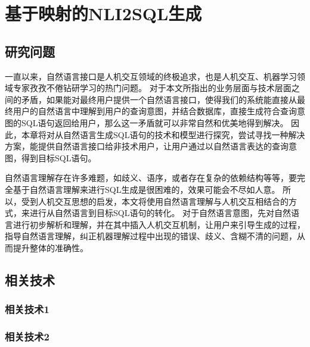 \chapter{基于映射的NLI2SQL生成}
\label{chap:interaction}
\section{研究问题}

一直以来，自然语言接口是人机交互领域的终极追求，也是人机交互、机器学习领域专家孜孜不倦钻研学习的热门问题。
对于本文所指出的业务层面与技术层面之间的矛盾，如果能对最终用户提供一个自然语言接口，使得我们的系统能直接从最终用户的自然语言中理解到用户的查询意图，并结合数据库，直接生成符合查询意图的SQL语句返回给用户，那么这一矛盾就可以非常自然和优美地得到解决。
因此，本章将对从自然语言生成SQL语句的技术和模型进行探究，尝试寻找一种解决方案，能提供自然语言接口给非技术用户，让用户通过以自然语言表达的查询意图，得到目标SQL语句。

自然语言理解存在许多难题，如歧义、语序，或者存在复杂的依赖结构等等，要完全基于自然语言理解来进行SQL生成是很困难的，效果可能会不尽如人意。
所以，受到人机交互思想的启发，本文将使用自然语言理解与人机交互相结合的方式，来进行从自然语言到目标SQL语句的转化。
对于自然语言意图，先对自然语言进行初步解析和理解，并在其中插入人机交互机制，让用户来引导生成的过程，指导自然语言理解，纠正机器理解过程中出现的错误、歧义、含糊不清的问题，从而提升整体的准确性。


\section{相关技术}
\subsection{相关技术1}
\subsection{相关技术2}
